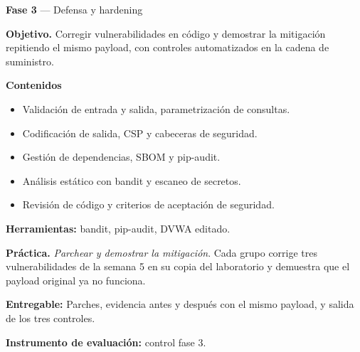 \documentclass[11pt,a4paper]{article}
\begin{document}
\begin{tcolorbox}[cajaContenido,title={Semana 7 --- Desarrollo seguro y cadena de suministro}]
\textbf{Fase 3} --- Defensa y hardening

\textbf{Objetivo.} Corregir vulnerabilidades en código y demostrar la mitigación repitiendo el mismo payload, con controles automatizados en la cadena de suministro.

\textbf{Contenidos}

\begin{itemize}[leftmargin=1.4em,itemsep=2pt,topsep=3pt]
  \item Validación de entrada y salida, parametrización de consultas.
  \item Codificación de salida, CSP y cabeceras de seguridad.
  \item Gestión de dependencias, SBOM y pip-audit.
  \item Análisis estático con bandit y escaneo de secretos.
  \item Revisión de código y criterios de aceptación de seguridad.
\end{itemize}

\textbf{Herramientas:} bandit, pip-audit, DVWA editado.

\textbf{Práctica.} \emph{Parchear y demostrar la mitigación}. Cada grupo corrige tres vulnerabilidades de la semana 5 en su copia del laboratorio y demuestra que el payload original ya no funciona.


\textbf{Entregable:} Parches, evidencia antes y después con el mismo payload, y salida de los tres controles.

\textbf{Instrumento de evaluación:} control fase 3.
\end{tcolorbox}
\end{document}
